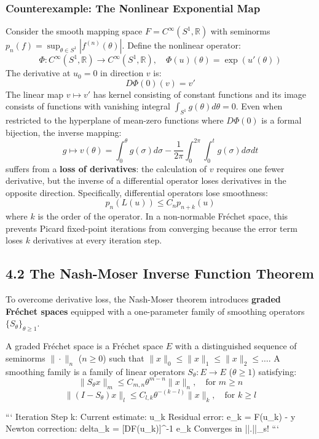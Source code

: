 \documentclass[11pt,twoside,openright]{amsbook}
\begin{document}
\subsubsection{Counterexample: The Nonlinear Exponential Map}
Consider the smooth mapping space $F = C^\infty(S^1, \mathbb{R})$ with seminorms $p_n(f) = \sup_{\theta \in S^1} |f^{(n)}(\theta)|$. Define the nonlinear operator:
$$\Phi: C^\infty(S^1, \mathbb{R}) \longrightarrow C^\infty(S^1, \mathbb{R}), \quad \Phi(u)(\theta) = \exp(u'(\theta))$$
The derivative at $u_0 = 0$ in direction $v$ is:
$$D\Phi(0)(v) = v'$$
The linear map $v \mapsto v'$ has kernel consisting of constant functions and its image consists of functions with vanishing integral $\int_{S^1} g(\theta) d\theta = 0$. Even when restricted to the hyperplane of mean-zero functions where $D\Phi(0)$ is a formal bijection, the inverse mapping:
$$g \longmapsto v(\theta) = \int_0^\theta g(\sigma) d\sigma - \frac{1}{2\pi}\int_0^{2\pi}\int_0^t g(\sigma) d\sigma dt$$
suffers from a \textbf{loss of derivatives}: the calculation of $v$ requires one fewer derivative, but the inverse of a differential operator loses derivatives in the opposite direction. Specifically, differential operators lose smoothness:
$$p_n(L(u)) \leq C_n p_{n+k}(u)$$
where $k$ is the order of the operator. In a non-normable Fréchet space, this prevents Picard fixed-point iterations from converging because the error term loses $k$ derivatives at every iteration step.

\subsection{4.2 The Nash-Moser Inverse Function Theorem}
To overcome derivative loss, the Nash-Moser theorem introduces \textbf{graded Fréchet spaces} equipped with a one-parameter family of smoothing operators $\{S_\theta\}_{\theta \geq 1}$.

A graded Fréchet space is a Fréchet space $E$ with a distinguished sequence of seminorms $\|\cdot\|_n$ ($n \geq 0$) such that $\|x\|_0 \leq \|x\|_1 \leq \|x\|_2 \leq \dots$. A smoothing family is a family of linear operators $S_\theta: E \to E$ ($\theta \geq 1$) satisfying:
$$\|S_\theta x\|_m \leq C_{m, n} \theta^{m-n} \|x\|_n, \quad \text{for } m \geq n$$
$$\|(I - S_\theta) x\|_l \leq C_{l, k} \theta^{-(k-l)} \|x\|_k, \quad \text{for } k \geq l$$

```
   Iteration Step k:
   Current estimate:  u_k
   Residual error:    e_k = F(u_k) - y
   Newton correction: delta_k = [DF(u_k)]^{-1} e_k    Converges in ||.||_s!
```
\end{document}
